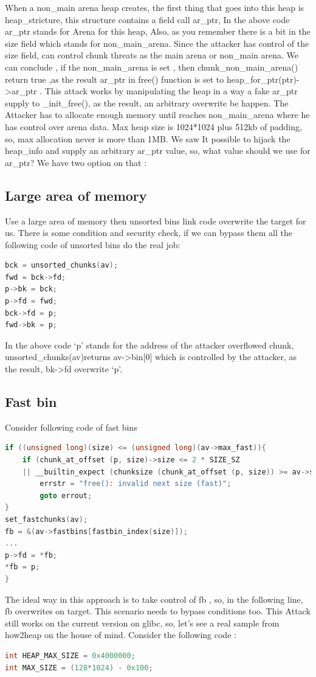 \documentclass{masterthesis}
\newcommand*\libc{glibc}
\newcommand*\fb{fast bins}
\newcommand*\ub{unsorted bins}
\begin{document}
When a non\_main arena heap creates, the first thing that goes into this heap is heap\_stricture, this structure contains a field call ar\_ptr, In the above code ar\_ptr stands for Arena for this heap, Also, as you remember there is a bit in the size field which stands for non\_main\_arena. Since the attacker has control of the size field, can control chunk threats as the main arena or non\_main arena. We can conclude , if the non\_main\_arena is set , then chunk\_non\_main\_arena() return true ,as the result ar\_ptr in free() function is set to heap\_for\_ptr(ptr)->ar\_ptr .
This attack works by manipulating the heap in a way a fake ar\_ptr supply to \_init\_free(), as the result, an arbitrary overwrite be happen. The Attacker has to allocate enough memory until reaches non\_main\_arena where he has control over arena data. Max heap size is 1024*1024 plus 512kb of padding, so, max allocation never is more than 1MB.
We saw It possible to hijack the heap\_info and supply an arbitrary ar\_ptr value, so, what value should we use for ar\_ptr? We have two option on that :

\subsection{Large area of memory}
Use a large area of memory then \ub{} link code overwrite the target for us. There is some condition and security check, if we can bypass them all the following code of \ub{} do the real job:
\begin{lstlisting}[language=c,frame=tlrb]
bck = unsorted_chunks(av);
fwd = bck->fd;
p->bk = bck;
p->fd = fwd;
bck->fd = p;
fwd->bk = p;
 \end{lstlisting}
In the above code ‘p’ stands for the address of the attacker overflowed chunk, unsorted\_chunks(av)returns av->bin[0] which is controlled by the attacker, as the result, bk->fd overwrite ‘p’.

\subsection{Fast bin}
Consider following code of \fb{}
\begin{lstlisting}[language=c,frame=tlrb]
if ((unsigned long)(size) <= (unsigned long)(av->max_fast)){
	if (chunk_at_offset (p, size)->size <= 2 * SIZE_SZ
	|| __builtin_expect (chunksize (chunk_at_offset (p, size)) >= av->system_mem, 0)){
		errstr = "free(): invalid next size (fast)";
		goto errout;
}
set_fastchunks(av);
fb = &(av->fastbins[fastbin_index(size)]);
...
p->fd = *fb;
*fb = p;
}

 \end{lstlisting}
The ideal way in this approach is to take control of fb , so, in the following line, fb overwrites on target. This scenario needs to bypass conditions too. This Attack still works on the current version on \libc{}, so, let's see a real sample from how2heap on the house of mind. Consider the following code : 
\begin{lstlisting}[language=c,frame=tlrb]
int HEAP_MAX_SIZE = 0x4000000;
int MAX_SIZE = (128*1024) - 0x100;
\end{lstlisting}
\end{document}
